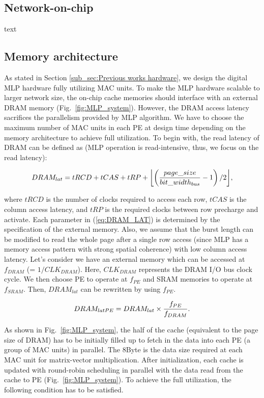 \documentclass[pageno]{jpaper}
\DeclarePairedDelimiter{\floor}{\lfloor}{\rfloor}
\begin{document}
\subsection{Network-on-chip}\label{sub_sec:noc}
text

\subsection{Memory architecture}\label{sub_sec:mem_arch}
As stated in Section \ref{sub_sec:Previous works hardware}, we design the digital MLP hardware fully utilizing MAC units. To make the MLP hardware scalable to larger network size, the on-chip cache memories should interface with an external DRAM memory (Fig.~\ref{fig:MLP_system}). However, the DRAM access latency sacrifices the parallelism provided by MLP algorithm. We have to choose the maximum number of MAC units in each PE at design time depending on the memory architecture to achieve full utilization.
To begin with, the read latency of DRAM can be defined as (MLP operation is read-intensive, thus, we focus on the read latency):

\begin{equation}
	DRAM_{lat} = tRCD + tCAS + tRP + \floor[\bigg]{\left(\frac{page\_size}{bit\_width_{bus}}-1\right)/2},
	\label{eq:DRAM_LAT}
\end{equation}

where $tRCD$ is the number of clocks required to access each row, $tCAS$ is the column access latency, and $tRP$ is the required clocks between row precharge and activate. Each parameter in (\ref{eq:DRAM_LAT}) is determined by the specification of the external memory. Also, we assume that the burst length can be modified to read the whole page after a single row access (since MLP has a memory access pattern with strong spatial coherence) with low column access latency. Let’s consider we have an external memory which can be accessed at $f_{DRAM}$ (= $1/CLK_{DRAM}$). Here, $CLK_{DRAM}$ represents the DRAM I/O bus clock cycle. We then choose PE to operate at $f_{PE}$ and SRAM memories to operate at $f_{SRAM}$. Then, $DRAM_{lat}$ can be rewritten by using $f_{PE}$.

\begin{equation}
	DRAM_{lat\-PE} = DRAM_{lat} \times \frac{f_{PE}}{f_{DRAM}}.
	\label{eq:DRAM_LAT_PE}
\end{equation}

As shown in Fig.~\ref{fig:MLP_system}, the half of the cache (equivalent to the page size of DRAM) has to be initially filled up to fetch in the data into each PE (a group of MAC units) in parallel. The 8Byte is the data size required at each MAC unit for matrix-vector multiplication. After initialization, each cache is updated with round-robin scheduling in parallel with the data read from the cache to PE (Fig.~\ref{fig:MLP_system}). To achieve the full utilization, the following condition has to be satisfied.
\end{document}
